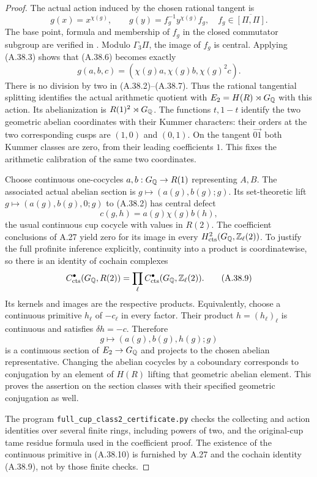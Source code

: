 \begin{proof}
The actual action induced by the chosen rational tangent is
\[
 g(x)=x^{\chi(g)},\qquad
 g(y)=f_g^{-1}y^{\chi(g)}f_g,
                       \quad f_g\in\overline{[\Pi,\Pi]}.
                                                                    \tag{A.38.6}
\]
The base point, formula and membership of $f_g$ in the closed
commutator subgroup are verified in
\cite[\S2, equation (2.1) and the following paragraph]{BIR_NakamuraSchneps2000}.
Modulo $\Gamma_3\Pi$, the image of $f_g$ is central.  Applying
(A.38.3) shows that (A.38.6) becomes exactly
\[
          g(a,b,c)=(\chi(g)a,\chi(g)b,\chi(g)^2c).             \tag{A.38.7}
\]
There is no division by two in (A.38.2)--(A.38.7).  Thus the
rational tangential splitting identifies the actual arithmetic
quotient with $E_2=H(R)\rtimes G_\mathbb Q$ with this action.
Its abelianization is $R(1)^2\rtimes G_\mathbb Q$.  The functions
$t,1-t$ identify the two geometric abelian coordinates with their
Kummer characters: their orders at the two corresponding cusps
are $(1,0)$ and $(0,1)$.  On the tangent
$\overrightarrow{01}$ both Kummer classes are zero, from their
leading coefficients $1$.  This fixes the arithmetic calibration
of the same two coordinates.

Choose continuous one-cocycles $a,b:G_\mathbb Q\to R(1)$ representing
$A,B$.  The associated actual abelian section is
$g\mapsto(a(g),b(g);g)$.  Its set-theoretic lift
$g\mapsto(a(g),b(g),0;g)$ to (A.38.2) has central defect
\[
                     c(g,h)=a(g)\chi(g)b(h),                  \tag{A.38.8}
\]
the usual continuous cup cocycle with values in $R(2)$.
The coefficient conclusions of A.27 yield zero for its image
in every $H^2_{\rm cts}(G_\mathbb Q,\mathbb Z_\ell(2))$.
To justify the full profinite inference explicitly, continuity
into a product is coordinatewise, so there is an identity of
cochain complexes
\[
 C^\bullet_{\rm cts}(G_\mathbb Q,R(2))
       =\prod_\ell C^\bullet_{\rm cts}(G_\mathbb Q,\mathbb Z_\ell(2)).      \tag{A.38.9}
\]
Its kernels and images are the respective products.  Equivalently,
choose a continuous primitive $h_\ell$ of $-c_\ell$ in every
factor.  Their product $h=(h_\ell)_\ell$ is continuous and
satisfies $\delta h=-c$.  Therefore
\[
                    g\longmapsto(a(g),b(g),h(g);g)            \tag{A.38.10}
\]
is a continuous section of $E_2\to G_\mathbb Q$ and projects to the
chosen abelian representative.  Changing the abelian cocycles
by a coboundary corresponds to conjugation by an element of
$H(R)$ lifting that geometric abelian element.  This proves
the assertion on the section classes with their specified
geometric conjugation as well.

The program \texttt{full\_cup\_class2\_certificate.py} checks
the collecting and action identities over several finite rings,
including powers of two, and the original-cup tame residue
formula used in the coefficient proof.  The existence of the
continuous primitive in (A.38.10) is furnished by A.27 and the
cochain identity (A.38.9), not by those finite checks.
\end{proof}

